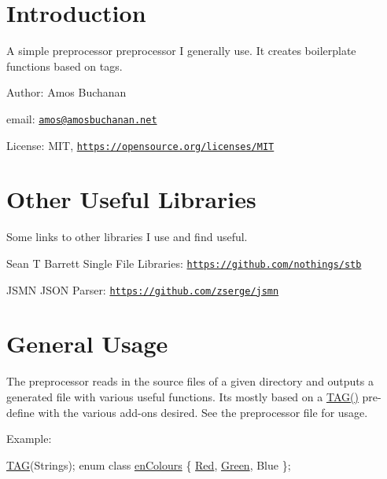 \hypertarget{index_autotoc_md5}{}\section{Introduction}\label{index_autotoc_md5}
A simple preprocessor preprocessor I generally use. It creates boilerplate functions based on tags.


\begin{DoxyItemize}
\item Author\+: Amos Buchanan
\item email\+: \href{mailto:amos@amosbuchanan.net}{\tt amos@amosbuchanan.\+net}
\item License\+: M\+IT, \href{https://opensource.org/licenses/MIT}{\tt https\+://opensource.\+org/licenses/\+M\+IT}
\end{DoxyItemize}\hypertarget{index_autotoc_md6}{}\section{Other Useful Libraries}\label{index_autotoc_md6}
Some links to other libraries I use and find useful.


\begin{DoxyItemize}
\item Sean T Barrett Single File Libraries\+: \href{https://github.com/nothings/stb}{\tt https\+://github.\+com/nothings/stb}
\item J\+S\+MN J\+S\+ON Parser\+: \href{https://github.com/zserge/jsmn}{\tt https\+://github.\+com/zserge/jsmn}
\end{DoxyItemize}\hypertarget{index_autotoc_md7}{}\section{General Usage}\label{index_autotoc_md7}
The preprocessor reads in the source files of a given directory and outputs a generated file with various useful functions. It\textquotesingle{}s mostly based on a \hyperlink{PreprocTest_8h_a2606cd56d2d8f567785bde5848176722}{T\+A\+G()} pre-\/define with the various add-\/ons desired. See the preprocessor file for usage.

Example\+:


\begin{DoxyCode}
\hyperlink{PreprocTest_8h_a2606cd56d2d8f567785bde5848176722}{TAG}(Strings);
\textcolor{keyword}{enum class} \hyperlink{PreprocTest_8h_a081cf1a0e70d6e2bd48c98f457742877}{enColours}
\{
    \hyperlink{PreprocTest_8h_a081cf1a0e70d6e2bd48c98f457742877aee38e4d5dd68c4e440825018d549cb47}{Red},
    \hyperlink{PreprocTest_8h_a081cf1a0e70d6e2bd48c98f457742877ad382816a3cbeed082c9e216e7392eed1}{Green},
    Blue
\};
\end{DoxyCode}


